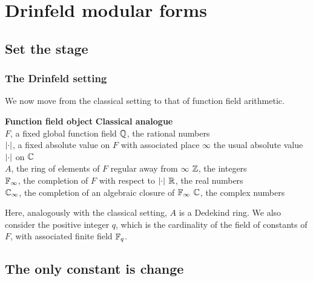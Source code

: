 \section{Drinfeld modular forms}


\subsection{Set the stage}

\begin{frame} \frametitle{The Drinfeld setting}
  We now move from the classical setting to that of function field arithmetic.

  \textbf{Function field object} \hfill \textbf{Classical analogue} \pause \\
  $F$, a fixed global function field \hfill $\mathbb{Q}$, the rational numbers \pause \\
  $\left\lvert\cdot\right\rvert$, a fixed absolute value on $F$ with associated place $\infty$ \hfill the usual absolute value $\left\lvert\cdot\right\rvert$ on $\mathbb{C}$ \pause \\
  $A$, the ring of elements of $F$ regular away from $\infty$ \hfill $\mathbb{Z}$, the integers \pause \\
  $\mathbb{F}_\infty$, the completion of $F$ with respect to $\left\lvert\cdot\right\rvert$ \hfill $\mathbb{R}$, the real numbers \pause \\
  $\mathbb{C}_\infty$, the completion of an algebraic closure of $\mathbb{F}_\infty$ \hfill $\mathbb{C}$, the complex numbers \pause

  Here, analogously with the classical setting, $A$ is a Dedekind ring.
  We also consider the positive integer $q$, which is the cardinality of the field of constants of $F$, with associated finite field $\mathbb{F}_q$.
\end{frame}


\subsection{The only constant is change}

